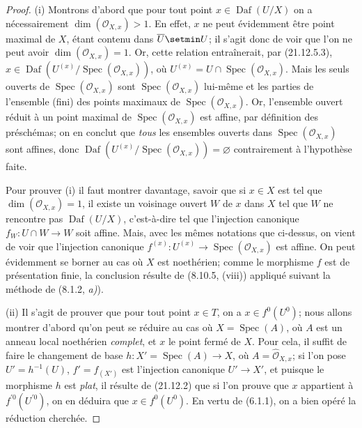 \begin{proof}
(i) Montrons d'abord que pour tout point $x\in\operatorname{Daf}(U/X)$ on a
nécessairement $\dim(\mathcal O_{X,x})>1$. En effet, $x$ ne peut évidemment être point
maximal de $X$, étant contenu dans $\overline U\setmin U$; il s'agit donc de voir que l'on ne
peut avoir $\dim(\mathcal O_{X,x})=1$. Or, cette relation entraînerait, par (21.12.5.3),
$x\in\operatorname{Daf}(U^{(x)}/\operatorname{Spec}(\mathcal O_{X,x}))$, où
$U^{(x)}=U\cap\operatorname{Spec}(\mathcal O_{X,x})$. Mais les seuls ouverts de
$\operatorname{Spec}(\mathcal O_{X,x})$ sont $\operatorname{Spec}(\mathcal O_{X,x})$
lui-même et les parties de l'ensemble (fini) des points maximaux de
$\operatorname{Spec}(\mathcal O_{X,x})$. Or, l'ensemble ouvert réduit à un point maximal
de $\operatorname{Spec}(\mathcal O_{X,x})$ est affine, par définition des préschémas; on
en conclut que \emph{tous} les ensembles ouverts dans
$\operatorname{Spec}(\mathcal O_{X,x})$ sont affines, donc
$\operatorname{Daf}(U^{(x)}/\operatorname{Spec}(\mathcal O_{X,x}))=\varnothing$
contrairement à l'hypothèse faite.

Pour prouver (i) il faut montrer davantage, savoir que si $x\in X$ est tel que
$\dim(\mathcal O_{X,x})=1$, il existe un voisinage ouvert $W$ de $x$ dans $X$ tel que
$W$ ne rencontre pas $\operatorname{Daf}(U/X)$, c'est-à-dire tel que l'injection
canonique $f_W:U\cap W\to W$ soit affine. Mais, avec les mêmes notations que ci-dessus,
on vient de voir que l'injection canonique
$f^{(x)}:U^{(x)}\to\operatorname{Spec}(\mathcal O_{X,x})$ est affine. On peut
évidemment se borner au cas où $X$ est noethérien; comme le morphisme $f$ est de
présentation finie, la conclusion résulte de (8.10.5, (viii)) appliqué suivant la
méthode de (8.1.2, \emph{a)}).

(ii) Il s'agit de prouver que pour tout point $x\in T$, on a $x\in f^0(U^0)$; nous
allons montrer d'abord qu'on peut se réduire au cas où $X=\operatorname{Spec}(A)$, où
$A$ est un anneau local noethérien \emph{complet}, et $x$ le point fermé de $X$. Pour
cela, il suffit de faire le changement de base
$h:X'=\operatorname{Spec}(A)\to X$, où $A=\widehat{\mathcal O}_{X,x}$; si l'on pose
$U'=h^{-1}(U)$, $f'=f_{(X')}$ est l'injection canonique $U'\to X'$, et puisque le
morphisme $h$ est \emph{plat}, il résulte de (21.12.2) que si l'on prouve que $x$ appartient à
$f^{\prime 0}(U^{\prime 0})$, on en déduira que $x\in f^0(U^0)$. En vertu de (6.1.1), on a
bien opéré la réduction cherchée.


\end{proof}
